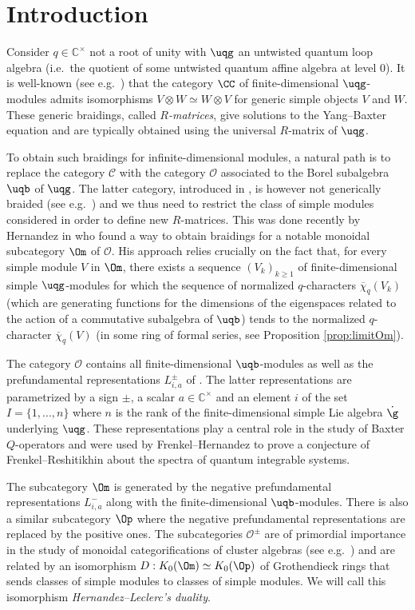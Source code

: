 \documentclass[11pt]{amsart}
\theoremstyle{definition}
\theoremstyle{remark}
\numberwithin{equation}{section}
\begin{document}
\section{Introduction}\label{sec:Intro} Consider $q \in \mathbb{C}^{\times}$ not a root of unity with $\uqg$ an untwisted quantum loop algebra (i.e.~the quotient of some untwisted quantum affine algebra at level 0). It is well-known (see e.g.~\cite{dr1}) that the category $\CC$ of finite-dimensional $\uqg$-modules admits isomorphisms $V\otimes W \simeq W\otimes V$ for generic simple objects $V$ and $W$. These generic 
braidings, called \textit{$R$-matrices}, give solutions to the Yang--Baxter equation and are typically obtained using the universal $R$-matrix of $\uqg$.\par
To obtain such braidings for infinite-dimensional modules, a natural path is to replace the category $\mathcal{C}$ with the category $\mathcal{O}$ associated to the Borel subalgebra $\uqb$ of $\uqg$. The latter category, introduced in \cite{hj}, is however not generically braided (see e.g.~\cite{bjmst, her}) and we thus need to restrict the class of simple modules considered in order to define new $R$-matrices. This was done recently by Hernandez in \cite{her} who found a way to obtain braidings for a notable monoidal subcategory $\Om$ of $\mathcal{O}$. His approach relies crucially on the fact that, for every simple module $V$ in $\Om$, there exists a sequence $(V_k)_{k\geq 1}$ of finite-dimensional simple $\uqg$-modules for which the sequence of normalized $q$-characters $\overline{\chi}_q(V_k)$ (which are generating functions for the dimensions of the eigenspaces related to the action of a commutative subalgebra of $\uqb$) tends to the normalized $q$-character $\overline{\chi}_q(V)$ (in some ring of formal series, 
see Proposition \ref{prop:limitOm}). \par
The category $\mathcal{O}$ contains all finite-dimensional $\uqb$-modules as well as the prefundamental representations $L_{i,a}^{\pm}$ of \cite{hj}. The latter representations are parametrized by a sign $\pm$, a scalar $a \in \mathbb{C}^{\times}$ and an element $i$ of the set $I=\{1,...,n\}$ where $n$ is the rank of the finite-dimensional simple Lie algebra $\dot{\g}$ underlying $\uqg$. These representations play a central role in the study of Baxter $Q$-operators and were used by Frenkel--Hernandez \cite{fh1} to prove a conjecture of Frenkel--Reshitikhin \cite{fr} about the spectra of quantum integrable systems. \par 
The subcategory $\Om$ is generated by the negative prefundamental representations $L_{i,a}^-$ along with the finite-dimensional $\uqb$-modules. There is also a similar subcategory $\Op$ where the negative prefundamental representations are replaced by the positive ones. The subcategories $\mathcal{O}^{\pm}$ are of primordial importance in the study of monoidal categorifications of cluster algebras (see e.g.~\cite{hl2, kkop2,kkop3}) and are related by an isomorphism $D:K_0(\Om)\simeq K_0(\Op)$ of Grothendieck rings that sends classes of simple modules to classes of simple modules. We will call this isomorphism \textit{Hernandez--Leclerc's duality}.
\end{document}
